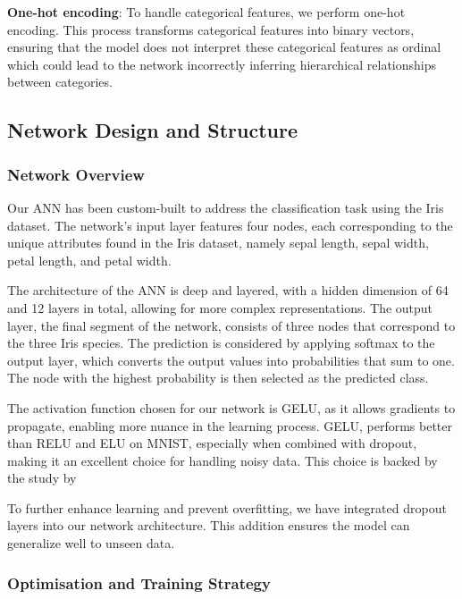 \documentclass[conference]{inc/IEEEtran}
\begin{document}
\textbf{One-hot encoding}: To handle categorical features, we perform one-hot encoding. This process transforms categorical features into binary vectors, ensuring that the model does not interpret these categorical features as ordinal which could lead to the network incorrectly inferring hierarchical relationships between categories.

\subsection{Network Design and Structure}


\subsubsection{Network Overview}

Our ANN has been custom-built to address the classification task using the Iris dataset. The network's input layer features four nodes, each corresponding to the unique attributes found in the Iris dataset, namely sepal length, sepal width, petal length, and petal width.

The architecture of the ANN is deep and layered, with a hidden dimension of 64 and 12 layers in total, allowing for more complex representations. The output layer, the final segment of the network, consists of three nodes that correspond to the three Iris species. The prediction is considered by applying softmax to the output layer, which converts the output values into probabilities that sum to one. The node with the highest probability is then selected as the predicted class.

The activation function chosen for our network is GELU, as it allows gradients to propagate, enabling more nuance in the learning process. GELU, performs better than  RELU and ELU on MNIST, especially when combined with dropout, making it an excellent choice for handling noisy data. This choice is backed by the study by

To further enhance learning and prevent overfitting, we have integrated dropout layers into our network architecture. This addition ensures the model can generalize well to unseen data.


\subsubsection{Optimisation and Training Strategy}
\end{document}
